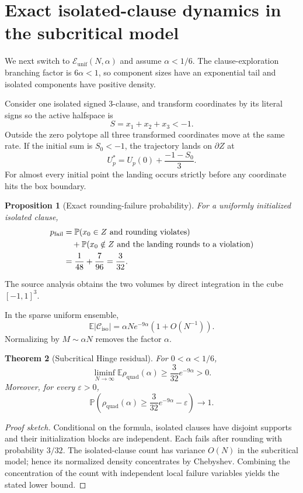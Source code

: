 \documentclass[11pt,a4paper]{article}
\newtheorem{theorem}{Theorem}[section]
\newtheorem{proposition}[theorem]{Proposition}
\begin{document}
\section{Exact isolated-clause dynamics in the subcritical model}
We next switch to $\mathcal E_{\mathrm{unif}}(N,\alpha)$ and assume $\alpha<1/6$. The clause-exploration branching factor is $6\alpha<1$, so component sizes have an exponential tail and isolated components have positive density.

Consider one isolated signed 3-clause, and transform coordinates by its literal signs so the active halfspace is
\[
S=x_1+x_2+x_3<-1.
\]
Outside the zero polytope all three transformed coordinates move at the same rate. If the initial sum is $S_0<-1$, the trajectory lands on $\partial Z$ at
\[
U_p^*=U_p(0)+\frac{-1-S_0}{3}.
\]
For almost every initial point the landing occurs strictly before any coordinate hits the box boundary.

\begin{proposition}[Exact rounding-failure probability]
For a uniformly initialized isolated clause,
\begin{align}
p_{\mathrm{fail}}
&=\mathbb P(x_0\in Z\text{ and rounding violates})\notag\\
&\quad+\mathbb P(x_0\notin Z\text{ and the landing rounds to a violation})\notag\\
&=\frac1{48}+\frac7{96}=\frac3{32}.
\end{align}
\end{proposition}
The source analysis obtains the two volumes by direct integration in the cube $[-1,1]^3$.

In the sparse uniform ensemble,
\[
\mathbb E|\mathcal C_{\mathrm{iso}}|=\alpha N e^{-9\alpha}(1+O(N^{-1})).
\]
Normalizing by $M\sim\alpha N$ removes the factor $\alpha$.

\begin{theorem}[Subcritical Hinge residual]
For $0<\alpha<1/6$,
\[
\liminf_{N\to\infty}\mathbb E\rho_{\mathrm{quad}}(\alpha)
\ge\frac3{32}e^{-9\alpha}>0.
\]
Moreover, for every $\varepsilon>0$,
\[
\mathbb P\!\left(\rho_{\mathrm{quad}}(\alpha)
\ge\frac3{32}e^{-9\alpha}-\varepsilon\right)\to1.
\]
\end{theorem}
\begin{proof}[Proof sketch]
Conditional on the formula, isolated clauses have disjoint supports and their initialization blocks are independent. Each fails after rounding with probability $3/32$. The isolated-clause count has variance $O(N)$ in the subcritical model; hence its normalized density concentrates by Chebyshev. Combining the concentration of the count with independent local failure variables yields the stated lower bound.
\end{proof}
\end{document}

